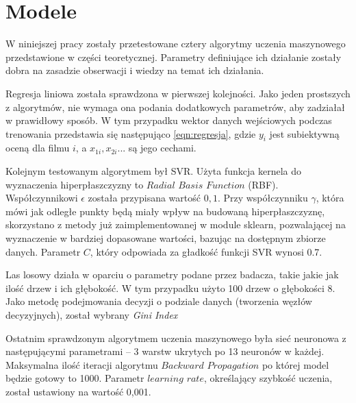 \section{Modele }
\label{cha:drugiDokument}
W niniejszej pracy zostały przetestowane cztery algorytmy uczenia maszynowego przedstawione w części teoretycznej. Parametry definiujące ich działanie zostały dobra na zasadzie obserwacji i wiedzy na temat ich działania.\par

Regresja liniowa została sprawdzona w pierwszej kolejności. Jako jeden prostszych z algorytmów, nie wymaga ona podania dodatkowych parametrów, aby zadziałał w prawidłowy sposób. W tym przypadku wektor danych wejściowych podczas trenowania przedstawia się  następująco \ref{eqn:regresja}, gdzie $y_i$ jest subiektywną oceną dla filmu $i$, a $x_{1i}, x_{2i}...$ są jego cechami. \par

Kolejnym testowanym algorytmem był SVR. Użyta funkcja kernela do wyznaczenia hiperpłaszczyzny to $Radial$ $Basis$ $Function$ (RBF). Współczynnikowi $\epsilon$ została przypisana wartość $0,1$. Przy współczynniku $\gamma$, która mówi jak odległe punkty będą miały wpływ na budowaną hiperpłaszczyznę, skorzystano z metody już zaimplementowanej w module sklearn, pozwalającej na wyznaczenie w bardziej dopasowane wartości, bazując na dostępnym zbiorze danych. Parametr $C$, który odpowiada za gładkość funkcji SVR wynosi 0.7.\par

Las losowy działa w oparciu o parametry podane przez badacza, takie jakie jak ilość drzew i ich głębokość. W tym przypadku użyto 100 drzew o głębokości 8. Jako metodę podejmowania decyzji o podziale danych (tworzenia węzłów decyzyjnych), został wybrany \emph{Gini Index} \par

Ostatnim sprawdzonym algorytmem uczenia maszynowego była sieć neuronowa z następującymi parametrami -- 3 warstw ukrytych po 13 neuronów w każdej. Maksymalna ilość iteracji algorytmu $Backward$ $Propagation$ po której model będzie gotowy to 1000. Parametr $learning$ $rate$, określający szybkość uczenia, został ustawiony na wartość 0,001.\par

